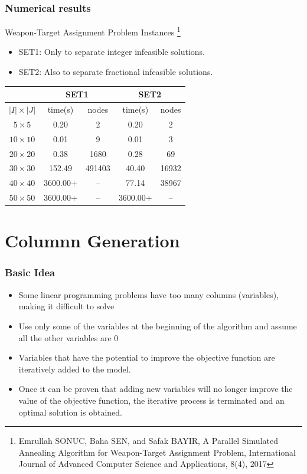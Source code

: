\documentclass[CJK,10pt]{beamer}
\begin{document}
\begin{frame}
    \frametitle{Numerical results}
    Weapon-Target Assignment Problem Instances \footnote{Emrullah SONUC, Baha SEN, and Safak BAYIR, A Parallel Simulated Annealing Algorithm for 
     Weapon-Target Assignment Problem, International Journal of Advanced Computer Science and Applications,
     8(4), 2017}
    \begin{itemize}
     \item SET1: Only to separate integer infeasible solutions.
     \item SET2: Also to separate fractional infeasible solutions.
    \end{itemize}
    \begin{table}
     \begin{tabular}{|c|c|c|c|c|}\hline
       & \multicolumn{2}{|c|}{SET1}& \multicolumn{2}{|c|}{SET2} \\\hline
      $|I|\times |J|$ &  time(s) & nodes &  time(s) & nodes\\\hline
      $5\times 5$ & 0.20 & 2 &  0.20 & 2\\\hline
      $10\times 10$ &  0.01 & 9 &  0.01 & 3\\\hline
      $20\times 20$ & 0.38 & 1680 &  0.28 & 69\\\hline
      $30\times 30$ & 152.49 & 491403 &  40.40 & 16932\\\hline
      $40\times 40$ & 3600.00+ & -- &  77.14  & 38967 \\\hline
      $50\times 50$ & 3600.00+ & -- & 3600.00+ & -- \\\hline 
     \end{tabular}
    \end{table}
   \end{frame}


\section{Columnn Generation}
\begin{frame}
    \frametitle{Basic Idea}
    \begin{itemize}
        \item Some linear programming problems have too many columns (variables), making it difficult to solve
        \item Use only some of the variables at the beginning of the algorithm and assume all the other variables are 0
        \item Variables that have the potential to improve the objective function are iteratively added to the model. 
        \item Once it can be proven that adding new variables will no longer improve the value of the objective function, the iterative process is terminated and an optimal solution is obtained.
    \end{itemize}
\end{frame}
\end{document}
